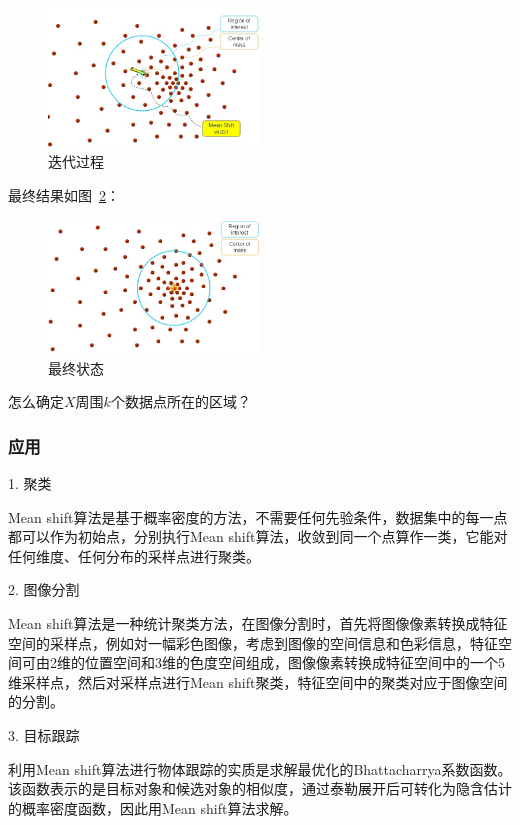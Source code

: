 \documentclass[12pt]{article}
\begin{document}
\begin{figure}[!ht]
\centering
\includegraphics[width=0.5\textwidth]{meanshift2.jpg}
\caption{迭代过程}
\label{fig: meanshift2}
\end{figure} 

最终结果如图~\ref{fig: meanshift3}：

\begin{figure}[!ht]
\centering
\includegraphics[width=0.5\textwidth]{meanshift3.jpg}
\caption{最终状态}
\label{fig: meanshift3}
\end{figure} 

怎么确定$X$周围$k$个数据点所在的区域？


\subsubsection{应用}

1. 聚类

Mean shift算法是基于概率密度的方法，不需要任何先验条件，数据集中的每一点都可以作为初始点，分别执行Mean shift算法，收敛到同一个点算作一类，它能对任何维度、任何分布的采样点进行聚类。

2. 图像分割

Mean shift算法是一种统计聚类方法，在图像分割时，首先将图像像素转换成特征空间的采样点，例如対一幅彩色图像，考虑到图像的空间信息和色彩信息，特征空间可由2维的位置空间和3维的色度空间组成，图像像素转换成特征空间中的一个5维采样点，然后对采样点进行Mean shift聚类，特征空间中的聚类对应于图像空间的分割。

3. 目标跟踪

利用Mean shift算法进行物体跟踪的实质是求解最优化的Bhattacharrya系数函数\cite{fashing2005mean}。该函数表示的是目标对象和候选对象的相似度，通过泰勒展开后可转化为隐含估计的概率密度函数，因此用Mean shift算法求解。
\end{document}
